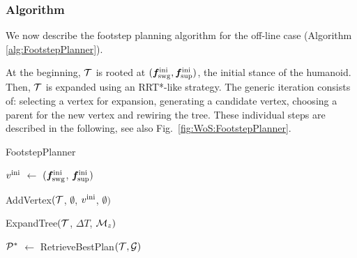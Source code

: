 \medskip

\subsubsection{Algorithm}
\label{sec:WoS:offlineCase:FP:PlannerOverview}

We now describe the footstep planning algorithm for the off-line case (Algorithm \ref{alg:FootstepPlanner}).

At the beginning, $\cal T$ is rooted at $({\bm{f}}_{\rm swg}^{\rm ini}, {\bm{f}}_{\rm sup}^{\rm ini})$, the initial stance of the humanoid.
Then, $\cal T$ is expanded using an RRT*-like strategy. The generic iteration consists of: selecting a vertex for expansion, generating a candidate vertex, choosing a parent for the new vertex and rewiring the tree. These individual steps are described in the following, see also Fig.~\ref{fig:WoS:FootstepPlanner}.

\begin{algorithm}%
	\small
	\removelatexerror
	
	\caption{FootstepPlanner}
	\label{alg:FootstepPlanner}

	\vspace{2pt}
    \BlankLine
    
	$v^{\rm ini}$ $\leftarrow$ $({{\bm{f}}}_{\rm swg}^{\rm ini}$, ${{\bm{f}}}_{\rm sup}^{\rm ini})$\; 
	
	AddVertex$(\cal T$, $\emptyset$, $v^{\rm ini}$, $\emptyset)$\;
	
	ExpandTree$(\cal T$, ${\Delta T}$, ${\cal M}_z)$\;
	
    ${\cal P}^*$ $\leftarrow$ RetrieveBestPlan$({\cal T}, {\cal G})$\;	
    \;
\end{algorithm}

